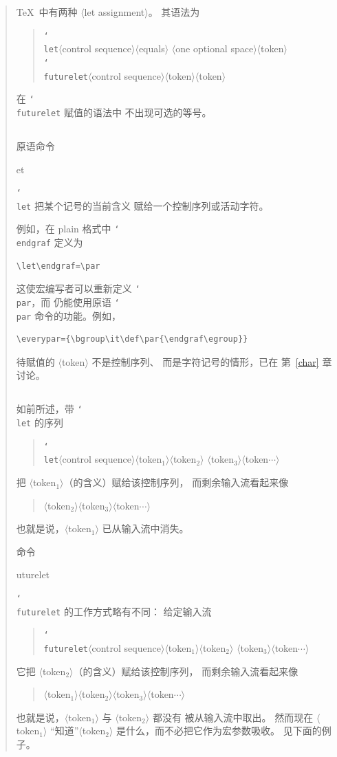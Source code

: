\documentclass[a4paper]{rapport3}
\makeatletter
\def\nl{\protect\\}\def\n#1{{\tt #1}}\def\cs#1{{\tt\char`\\#1}}\let\csc\cs
\def\gr#1{$\langle$#1$\rangle$}\def\key#1{{\tt#1}}
\newenvironment{disp}{\begin{quotation}}{\end{quotation}}
\def\cstoidx#1\par{\index{#1@\cs{#1}}}
\def\csidx#1{\cstoidx #1\par\cs{#1}}
\makeatother
\begin{document}
\begin{disp}
\TeX\ 中有两种 \gr{let assignment}。
其语法为
\begin{disp}\cs{let}\gr{control sequence}\gr{equals}%
     \gr{one optional space}\gr{token}\nl
     \cs{futurelet}\gr{control sequence}\gr{token}\gr{token}
     \end{disp}
在 \cs{futurelet} 赋值的语法中
不出现可选的等号。

\subsection{\protect\cs{let}}
\label{let}

原语命令 \csidx{let} 把某个记号的当前含义
赋给一个控制序列或活动字符。

例如，在 plain 格式中 \cs{endgraf} 定义为 \begin{verbatim}
\let\endgraf=\par
\end{verbatim}
这使宏编写者可以重新定义 \cs{par}，而
仍能使用原语 \cs{par}
命令的功能。例如，
\begin{verbatim}
\everypar={\bgroup\it\def\par{\endgraf\egroup}}
\end{verbatim}

待赋值的 \gr{token} 不是控制序列、
而是字符记号的情形，已在
第~\ref{char} 章讨论。

\subsection{\protect\cs{futurelet}}

如前所述，带 \cs{let} 的序列
\begin{disp}\cs{let}\gr{control sequence}\gr{token$_1$}\gr{token$_2$}%
       \gr{token$_3$}\gr{token$\cdots$}\end{disp}
把 \gr{token$_1$}（的含义）赋给该控制序列，
而剩余输入流看起来像
\begin{disp}\gr{token$_2$}\gr{token$_3$}\gr{token$\cdots$}\end{disp}
也就是说，\gr{token$_1$} 已从输入流中消失。

命令 \csidx{futurelet} 的工作方式略有不同：
给定输入流
\begin{disp}\cs{futurelet}\gr{control sequence}\gr{token$_1$}\gr{token$_2$}%
       \gr{token$_3$}\gr{token$\cdots$}\end{disp}
它把 \gr{token$_2$}（的含义）赋给该控制序列，
而剩余输入流看起来像
\begin{disp}\gr{token$_1$}\gr{token$_2$}\gr{token$_3$}\gr{token$\cdots$}\end{disp}
也就是说，\gr{token$_1$} 与 \gr{token$_2$} 都没有
被从输入流中取出。
然而现在 \gr{token$_1$}
“知道”\gr{token$_2$} 是什么，而不必把它作为宏参数吸收。
见下面的例子。


\end{disp}
\end{document}
